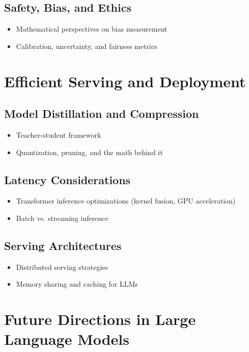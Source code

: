 \documentclass[12pt]{book}
\begin{document}
\section{Safety, Bias, and Ethics}
\begin{itemize}
    \item Mathematical perspectives on bias measurement
    \item Calibration, uncertainty, and fairness metrics
\end{itemize}


\chapter{Efficient Serving and Deployment}
\section{Model Distillation and Compression}
\begin{itemize}
    \item Teacher-student framework
    \item Quantization, pruning, and the math behind it
\end{itemize}

\section{Latency Considerations}
\begin{itemize}
    \item Transformer inference optimizations (kernel fusion, GPU acceleration)
    \item Batch vs. streaming inference
\end{itemize}

\section{Serving Architectures}
\begin{itemize}
    \item Distributed serving strategies
    \item Memory sharing and caching for LLMs
\end{itemize}


\chapter{Future Directions in Large Language Models}
\end{document}
